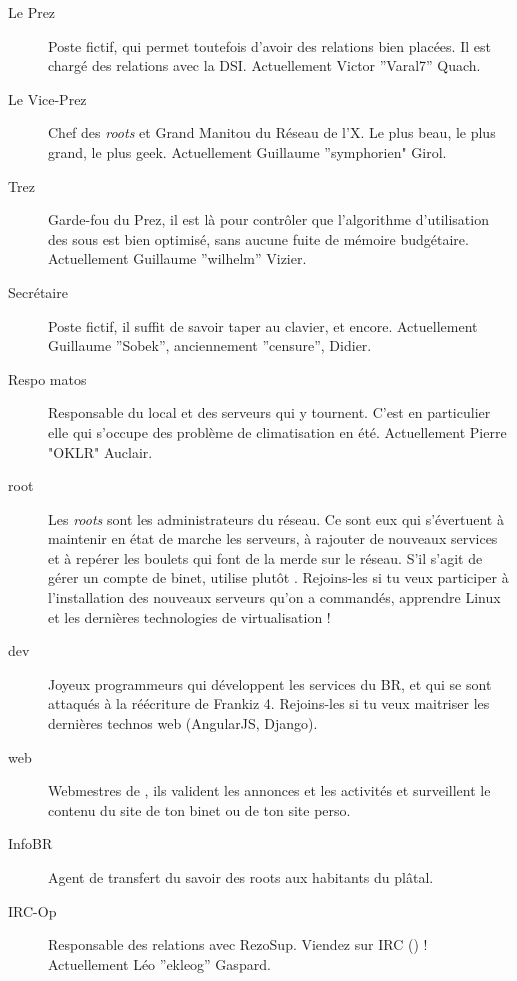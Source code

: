 \begin{description}

  \item[Le Prez]{Poste fictif, qui permet toutefois d'avoir des relations bien placées. Il est chargé des relations avec la DSI. Actuellement Victor ''Varal7'' Quach.}
  
  \item[Le Vice-Prez]{Chef des \emph{roots} et Grand Manitou du Réseau de l'X. Le plus beau, le plus grand, le plus geek. Actuellement Guillaume ''symphorien" Girol.}

  \item[Trez]{Garde-fou du Prez, il est là pour contrôler que l'algorithme d'utilisation des sous est bien optimisé, sans aucune fuite de mémoire budgétaire. Actuellement Guillaume ''wilhelm'' Vizier.}

  \item[Secrétaire]{Poste fictif, il suffit de savoir taper au clavier, et encore. Actuellement Guillaume ''Sobek'', anciennement ''censure'', Didier.}

 \item[Respo matos]{Responsable du local et des serveurs qui y tournent. C'est en particulier elle qui s'occupe des problème de climatisation en été. Actuellement Pierre "OKLR" Auclair.}

  \item[root]{Les \emph{roots} sont les administrateurs du réseau. Ce sont eux qui s'évertuent à maintenir en état de marche les serveurs, à rajouter de 
  nouveaux services et à repérer les boulets qui font de la merde sur le réseau. S'il s'agit de gérer un compte de binet, utilise plutôt . Rejoins-les si tu veux participer à l'installation des nouveaux serveurs qu'on a commandés, apprendre Linux et les dernières technologies de virtualisation !}
  \item[dev]{Joyeux programmeurs qui développent les services du BR, et qui se sont attaqués à la réécriture de Frankiz 4. Rejoins-les si tu veux maitriser les dernières technos web (AngularJS, Django).}

  \item[web] {Webmestres de \fkz, ils valident les annonces et les activités et surveillent le contenu du site de ton binet ou de ton site perso.}

   \item[InfoBR]{Agent de transfert du savoir des roots aux habitants du plâtal.}



  \item[IRC-Op]{Responsable des relations avec RezoSup. Viendez sur IRC () ! \linebreak Actuellement Léo ''ekleog'' Gaspard.}




\end{description}

